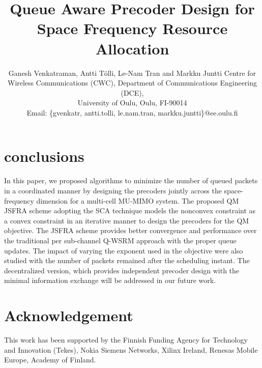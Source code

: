 \documentclass[journal]{./../Styles/IEEEtran}
\title{Queue Aware Precoder Design for Space Frequency Resource Allocation}
\author{{Ganesh Venkatraman, Antti T\"{o}lli, Le-Nam Tran and Markku Juntti}
{Centre for Wireless Communications (CWC), Department of Communications Engineering (DCE), \\
University of Oulu, Oulu, FI-90014\\
Email: \{gvenkatr, antti.tolli, le.nam.tran, markku.juntti\}@ee.oulu.fi}
}
\begin{document}
\maketitle

\begin{abstract}
\end{abstract}

\acresetall











\acresetall
\section{conclusions}\label{sec-5}
In this paper, we proposed algorithms to minimize the number of queued packets in a coordinated manner by designing the precoders jointly across the space-frequency dimension for a multi-cell \ac{MU-MIMO} system. The proposed \ac{QM} \ac{JSFRA} scheme adopting the \ac{SCA} technique models the nonconvex constraint as a convex constraint in an iterative manner to design the precoders for the \ac{QM} objective. The \ac{JSFRA} scheme provides better convergence and performance over the traditional per sub-channel \ac{Q-WSRM} approach with the proper queue updates. The impact of varying the exponent used in the objective were also studied with the number of packets remained after the scheduling instant. The decentralized version, which provides independent precoder design with the minimal information exchange will be addressed in our future work.

\section*{Acknowledgement}
This work has been supported by the Finnish Funding Agency for Technology and Innovation (Tekes), Nokia Siemens Networks, Xilinx Ireland, Renesas Mobile Europe, Academy of Finland.

\vfill


\end{document}

